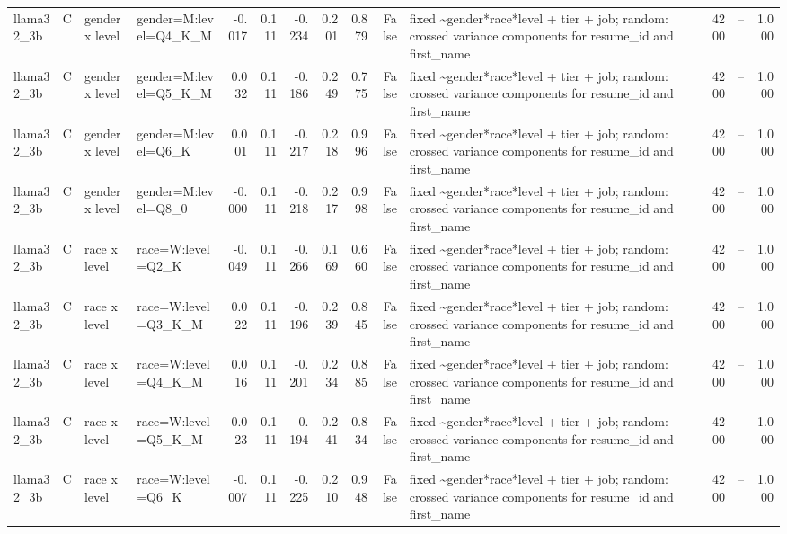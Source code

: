 \begin{tabular}{llllrrrrrrlrlr}
llama32\_3b & C & gender x level & gender=M:level=Q4\_K\_M & -0.017 & 0.111 & -0.234 & 0.201 & 0.879 & False & fixed \textasciitilde \space gender*race*level + tier + job; random: crossed variance components for resume\_id and first\_name & 4200 & -- & 1.000 \\
llama32\_3b & C & gender x level & gender=M:level=Q5\_K\_M & 0.032 & 0.111 & -0.186 & 0.249 & 0.775 & False & fixed \textasciitilde \space gender*race*level + tier + job; random: crossed variance components for resume\_id and first\_name & 4200 & -- & 1.000 \\
llama32\_3b & C & gender x level & gender=M:level=Q6\_K & 0.001 & 0.111 & -0.217 & 0.218 & 0.996 & False & fixed \textasciitilde \space gender*race*level + tier + job; random: crossed variance components for resume\_id and first\_name & 4200 & -- & 1.000 \\
llama32\_3b & C & gender x level & gender=M:level=Q8\_0 & -0.000 & 0.111 & -0.218 & 0.217 & 0.998 & False & fixed \textasciitilde \space gender*race*level + tier + job; random: crossed variance components for resume\_id and first\_name & 4200 & -- & 1.000 \\
llama32\_3b & C & race x level & race=W:level=Q2\_K & -0.049 & 0.111 & -0.266 & 0.169 & 0.660 & False & fixed \textasciitilde \space gender*race*level + tier + job; random: crossed variance components for resume\_id and first\_name & 4200 & -- & 1.000 \\
llama32\_3b & C & race x level & race=W:level=Q3\_K\_M & 0.022 & 0.111 & -0.196 & 0.239 & 0.845 & False & fixed \textasciitilde \space gender*race*level + tier + job; random: crossed variance components for resume\_id and first\_name & 4200 & -- & 1.000 \\
llama32\_3b & C & race x level & race=W:level=Q4\_K\_M & 0.016 & 0.111 & -0.201 & 0.234 & 0.885 & False & fixed \textasciitilde \space gender*race*level + tier + job; random: crossed variance components for resume\_id and first\_name & 4200 & -- & 1.000 \\
llama32\_3b & C & race x level & race=W:level=Q5\_K\_M & 0.023 & 0.111 & -0.194 & 0.241 & 0.834 & False & fixed \textasciitilde \space gender*race*level + tier + job; random: crossed variance components for resume\_id and first\_name & 4200 & -- & 1.000 \\
llama32\_3b & C & race x level & race=W:level=Q6\_K & -0.007 & 0.111 & -0.225 & 0.210 & 0.948 & False & fixed \textasciitilde \space gender*race*level + tier + job; random: crossed variance components for resume\_id and first\_name & 4200 & -- & 1.000 \\

\end{tabular}
